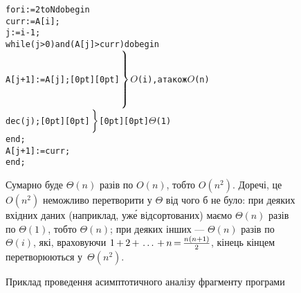 \begin{figure}[!b]
\begin{center}
\begin{minipage}{0.99\textwidth}
\vspace*{-0.5\baselineskip}
\hrulefill
\vspace*{-0.75\baselineskip}

\renewcommand{\baselinestretch}{1}
\begin{small}
\begin{alltt}
  for i:=2 to N do begin
    curr := A[i];
    j := i-1;
    while (j>0) and (A[j]>curr) do begin
      A[j+1] := A[j];                   \raisebox{0pt}[0pt][0pt]{\begin{math}\left.\vphantom{\begin{array}{c}a\\a\\a\\a\\a\end{array}}\right\}\end{math}} {\begin{math}O\end{math}(i), а також \begin{math}O\end{math}(n)}
      dec(j);         \raisebox{0.5\baselineskip}[0pt][0pt]{\begin{math}\left.\vphantom{\begin{array}{c}a\\a\end{array}}\right\}\end{math}} \raisebox{0.5\baselineskip}[0pt][0pt]{\begin{math}\Theta\end{math}(1)}
    end;
    A[j+1] := curr;
  end;
\end{alltt}
\vspace*{-\baselineskip}
\end{small}

\begin{small}
Сумарно буде $\Theta(n)$ разів по $O(n)$, тобто $O(n^2)$.
До\nolinebreak[3] речі, це $O(n^2)$ неможливо перетворити у $\Theta$ від чого б не було: при деяких вхідних даних (наприклад, уж\'{е} відсортованих) маємо $\Theta(n)$ разів по $\Theta(1)$, тобто $\Theta(n)$; при деяких інших --- $\Theta(n)$ разів по $\Theta(i)$, які, враховуючи $1\dib{{+}}2\dib{{+}}\dots\dib{{+}}n\dib{{=}}\frac{n(n+1)}{2}$, кінець кінцем перетворюються у~$\Theta(n^2)$.

\end{small}
\end{minipage}
\end{center}
\caption{Приклад проведення асимптотичного аналізу фрагменту програми}
\label{fig:example-of-asympthotic analysis}
\end{figure}

